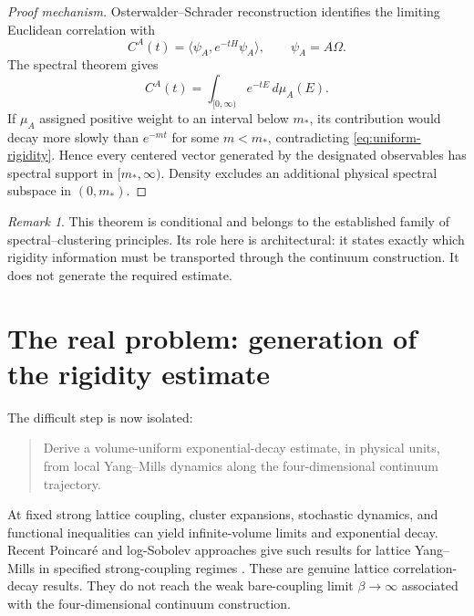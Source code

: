 \documentclass[11pt]{article}
\theoremstyle{remark}
\newtheorem{remark}{Remark}
\begin{document}
\begin{proof}[Proof mechanism]
Osterwalder--Schrader reconstruction identifies the limiting Euclidean
correlation with
\begin{equation}
  C^A(t)
  =
  \langle\psi_A,e^{-tH}\psi_A\rangle,
  \qquad \psi_A=A\Omega .
  \label{eq:os-semigroup}
\end{equation}
The spectral theorem gives
\begin{equation}
  C^A(t)
  =
  \int_{[0,\infty)}e^{-tE}\,d\mu_A(E).
  \label{eq:spectral-measure}
\end{equation}
If $\mu_A$ assigned positive weight to an interval below $m_*$, its contribution
would decay more slowly than $e^{-mt}$ for some $m<m_*$, contradicting
\eqref{eq:uniform-rigidity}.  Hence every centered vector generated by the
designated observables has spectral support in $[m_*,\infty)$.  Density excludes
an additional physical spectral subspace in $(0,m_*)$.
\end{proof}

\begin{remark}
This theorem is conditional and belongs to the established family of
spectral--clustering principles.  Its role here is architectural: it states
exactly which rigidity information must be transported through the continuum
construction.  It does not generate the required estimate.
\end{remark}

\section{The real problem: generation of the rigidity estimate}

The difficult step is now isolated:
\begin{quote}
Derive a volume-uniform exponential-decay estimate, in physical units, from
local Yang--Mills dynamics along the four-dimensional continuum trajectory.
\end{quote}

At fixed strong lattice coupling, cluster expansions, stochastic dynamics, and
functional inequalities can yield infinite-volume limits and exponential decay.
Recent Poincar\'e and log-Sobolev approaches give such results for lattice
Yang--Mills in specified strong-coupling regimes \cite{shen-zhu-zhu,nissim}.
These are genuine lattice correlation-decay results.  They do not reach the
weak bare-coupling limit $\beta\to\infty$ associated with the four-dimensional
continuum construction.
\end{document}
